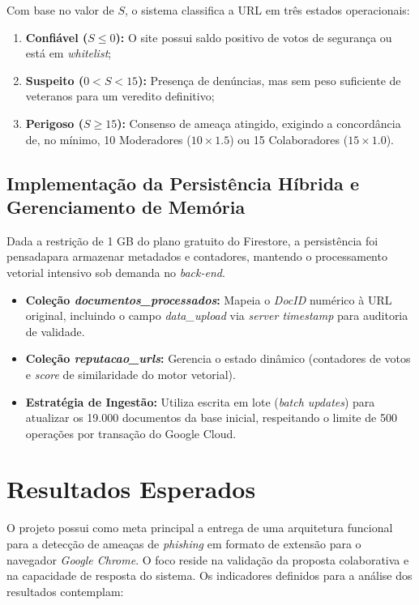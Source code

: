 \documentclass[a4paper,12pt]{article}
\begin{document}
Com base no valor de $S$, o sistema classifica a URL em três estados operacionais:
\begin{enumerate}
    \item \textbf{Confiável ($S \leq 0$):} O site possui saldo positivo de votos de segurança ou está em \textit{whitelist};
    \item \textbf{Suspeito ($0 < S < 15$):} Presença de denúncias, mas sem peso suficiente de veteranos para um veredito definitivo;
    \item \textbf{Perigoso ($S \geq 15$):} Consenso de ameaça atingido, exigindo a concordância de, no mínimo, 10 Moderadores ($10 \times 1.5$) ou 15 Colaboradores ($15 \times 1.0$).
\end{enumerate}

\subsection{Implementação da Persistência Híbrida e Gerenciamento de Memória}

Dada a restrição de 1 GB do plano gratuito do Firestore, a persistência foi pensadapara armazenar metadados e contadores, mantendo o processamento vetorial intensivo sob demanda no \textit{back-end}.

\begin{itemize}
    \item \textbf{Coleção \textit{documentos\_processados}:} Mapeia o \textit{DocID} numérico à URL original, incluindo o campo \textit{data\_upload} via \textit{server timestamp} para auditoria de validade.
    \item \textbf{Coleção \textit{reputacao\_urls}:} Gerencia o estado dinâmico (contadores de votos e \textit{score} de similaridade do motor vetorial).
    \item \textbf{Estratégia de Ingestão:} Utiliza escrita em lote (\textit{batch updates}) para atualizar os 19.000 documentos da base inicial, respeitando o limite de 500 operações por transação do Google Cloud.
\end{itemize}

\section{Resultados Esperados}
\label{sec:resultados_esp}

O projeto possui como meta principal a entrega de uma arquitetura funcional para a detecção de ameaças de \textit{phishing} em formato de extensão para o navegador \textit{Google Chrome}. O foco reside na validação da proposta colaborativa e na capacidade de resposta do sistema. Os indicadores definidos para a análise dos resultados contemplam:
\end{document}
